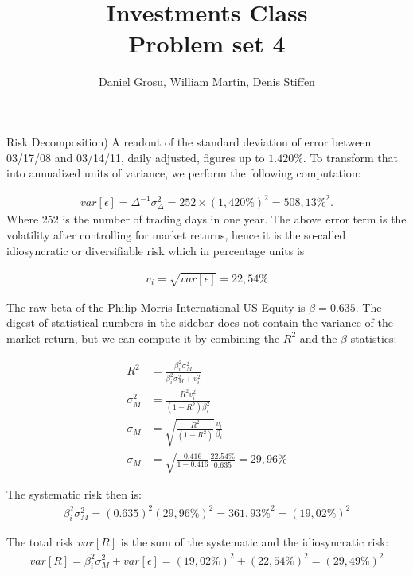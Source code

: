 \documentclass[10pt]{article}
\newenvironment{exercise}[2][Exercise]{\begin{trivlist}
  \item[\hskip \labelsep {\bfseries #1}\hskip \labelsep {\bfseries #2.}]}{\end{trivlist}}
\begin{document}
	
  \renewcommand{\qedsymbol}{\smiley}
	\title{Investments Class \\ Problem set 4}
	\author{Daniel Grosu, William Martin, Denis Stiffen}
		
\maketitle

\begin{exercise}{1}(Risk Decomposition)
      A readout of the standard deviation of error between
      \textrm{03/17/08} and \textrm{03/14/11}, daily adjusted, figures up to
      $1.420\%$. To transform that into annualized units of variance, we perform
      the following computation:

      \begin{align*}
        var\left[ \epsilon \right] = \Delta^{-1} \sigma_{\Delta}^2 = 252 \times (1,420 \%)^2 = 508,13 \%^2.
      \end{align*}
      Where $252$ is the number of trading days in one year.
      The above error term is the volatility after controlling for market
      returns, hence it is the so-called idiosyncratic or diversifiable risk
      which in percentage units is

      \begin{align*}
        v_i = \sqrt{var\left[ \epsilon \right]} = 22,54 \%
      \end{align*}

      The raw beta of the Philip Morris International US Equity is $\beta =
      0.635$. The digest of statistical numbers in the sidebar does not contain
      the variance of the market return, but we can compute it by combining the
      $R^2$ and the $\beta$ statistics:

      \begin{align*}
        R^2 &= \frac{\beta_i^2 \sigma_M^2}{\beta_i^2 \sigma_M^2 + v_i^2} \\
        \sigma_M^2 &= \frac{R^2 v_i^2}{(1 - R^2) \beta_i^2} \\
        \sigma_M &= \sqrt{\frac{R^2}{(1 - R^2)}}\frac{v_i}{\beta_i} \\
        \sigma_M &= \sqrt{\frac{0.416}{1 - 0.416}} \frac{22.54\%}{0.635} = 29,96\%
      \end{align*}

      The systematic risk then is:
      \begin{align*}
        \beta_i^2 \sigma_M^2 = (0.635)^2(29,96\%)^2 = 361,93\%^2 = (19,02\%)^2
      \end{align*}

      The total risk $var\left[ R \right]$ is the sum of the systematic and the
      idiosyncratic risk:
      \begin{align*}
        var\left[ R \right] = \beta_i^2 \sigma_M^2 + var\left[ \epsilon \right] = (19,02\%)^2 + (22,54\%)^2 = (29,49\%)^2
      \end{align*}
\end{exercise}
\end{document}
